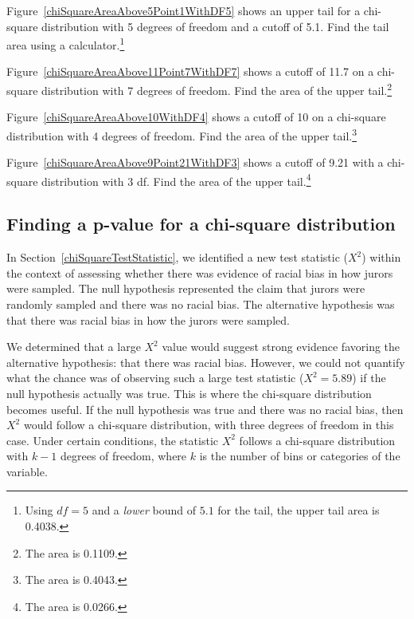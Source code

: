 \begin{exercise}
Figure~\ref{chiSquareAreaAbove5Point1WithDF5} shows an upper tail for a chi-square distribution with 5 degrees of freedom and a cutoff of 5.1. Find the tail area using a calculator.\footnote{Using $df = 5$ and a \emph{lower} bound of $5.1$ for the tail, the upper tail area is 0.4038.}
\end{exercise}

\begin{exercise}
Figure~\ref{chiSquareAreaAbove11Point7WithDF7} shows a cutoff of 11.7 on a chi-square distribution with 7 degrees of freedom. Find the area of the upper tail.\footnote{The area is 0.1109.}
\end{exercise}

\begin{exercise}
Figure~\ref{chiSquareAreaAbove10WithDF4} shows a cutoff of 10 on a chi-square distribution with 4 degrees of freedom. Find the area of the upper tail.\footnote{The area is 0.4043.}
\end{exercise}

\begin{exercise}
Figure~\ref{chiSquareAreaAbove9Point21WithDF3} shows a cutoff of 9.21 with a chi-square distribution with 3 df. Find the area of the upper tail.\footnote{The area is 0.0266.}
\end{exercise}


\subsection{Finding a p-value for a chi-square distribution}
\label{pValueForAChiSquareTest}

In Section~\ref{chiSquareTestStatistic}, we identified a new test statistic ($X^2$) within the context of assessing whether there was evidence of racial bias in how jurors were sampled. The null hypothesis represented the claim that jurors were randomly sampled and there was no racial bias. The alternative hypothesis was that there was racial bias in how the jurors were sampled.

We determined that a large $X^2$ value would suggest strong evidence favoring the alternative hypothesis: that there was racial bias. However, we could not quantify what the chance was of observing such a large test statistic ($X^2=5.89$) if the null hypothesis actually was true. This is where the chi-square distribution becomes useful. If the null hypothesis was true and there was no racial bias, then $X^2$ would follow a chi-square distribution, with three degrees of freedom in this case. Under certain conditions, the statistic $X^2$ follows a chi-square distribution with $k-1$ degrees of freedom, where $k$ is the number of bins or categories of the variable.

